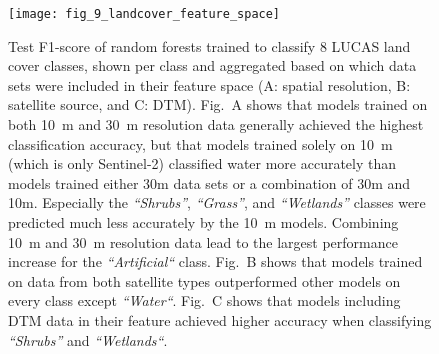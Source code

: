 \begin{figure}[!hbt]
    \texttt{[image: fig\_9\_landcover\_feature\_space]}

    \caption{Test F1-score of random forests trained to classify 8 LUCAS land cover classes, shown per class and aggregated based on which data sets were included in their feature space (A: spatial resolution, B: satellite source, and C: DTM). 
    Fig.\@~A shows that models trained on both 10\@~m and 30\@~m resolution data generally achieved the highest classification accuracy, but that models trained solely on 10~m (which is only Sentinel-2) classified water more accurately than models trained either 30m data sets or a combination of 30m and 10m. Especially the \emph{``Shrubs''}, \emph{``Grass''}, and \emph{``Wetlands''} classes were predicted much less accurately by the 10~m models. Combining 10\@~m and 30\@~m resolution data lead to the largest performance increase for the \emph{``Artificial``} class.
    Fig.\@~B shows that models trained on data from both satellite types outperformed other models on every class except \emph{``Water``}. 
    Fig.\@~C shows that models including DTM data in their feature achieved higher accuracy when classifying \emph{``Shrubs''} and \emph{``Wetlands``}.
    } 
    \label{fig:9_landcover_feature_space}
\end{figure}



